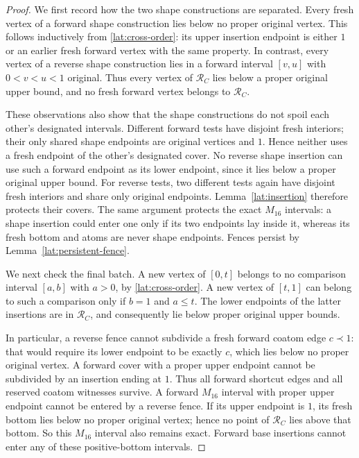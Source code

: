 \begin{proof}
We first record how the two shape constructions are separated.  Every
fresh vertex of a forward shape construction lies below no proper
original vertex.  This follows inductively from
\eqref{lat:cross-order}: its upper insertion endpoint is either $1$
or an earlier fresh forward vertex with the same property.  In
contrast, every vertex of a reverse shape construction lies in a
forward interval $[v,u]$ with $0<v<u<1$ original.  Thus every vertex
of $\mathcal R_C$ lies below a proper original upper bound, and no
fresh forward vertex belongs to $\mathcal R_C$.

These observations also show that the shape constructions do not
spoil each other's designated intervals.  Different forward tests
have disjoint fresh interiors; their only shared shape endpoints are
original vertices and $1$.  Hence neither uses a fresh endpoint of
the other's designated cover.  No reverse shape insertion can use
such a forward endpoint as its lower endpoint, since it lies below
a proper original upper bound.  For reverse tests, two different
tests again have disjoint fresh interiors and share only original
endpoints.  Lemma~\ref{lat:insertion} therefore protects their covers.
The same argument protects the exact $M_{16}$ intervals: a shape
insertion could enter one only if its two endpoints lay inside it,
whereas its fresh bottom and atoms are never shape endpoints.
Fences persist by Lemma~\ref{lat:persistent-fence}.

We next check the final batch.  A new vertex of $[0,t]$ belongs to no
comparison interval $[a,b]$ with $a>0$, by
\eqref{lat:cross-order}.  A new vertex of $[t,1]$ can belong to such
a comparison only if $b=1$ and $a\leq t$.  The lower endpoints of
the latter insertions are in $\mathcal R_C$, and consequently lie
below proper original upper bounds.

In particular, a reverse fence cannot subdivide a fresh forward
coatom edge $c\prec1$: that would require its lower endpoint to be
exactly $c$, which lies below no proper original vertex.  A forward
cover with a proper upper endpoint cannot be subdivided by an
insertion ending at $1$.  Thus all forward shortcut edges and all
reserved coatom witnesses survive.  A forward $M_{16}$ interval with
proper upper endpoint cannot be entered by a reverse fence.  If its
upper endpoint is $1$, its fresh bottom lies below no proper original
vertex; hence no point of $\mathcal R_C$ lies above that bottom.
So this $M_{16}$ interval also remains exact.  Forward base insertions
cannot enter any of these positive-bottom intervals.


\end{proof}
